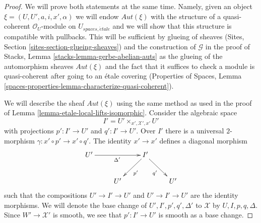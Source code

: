 \documentclass[10pt,a4paper]{amsart}
\theoremstyle{plain}
\theoremstyle{definition}
\theoremstyle{remark}
\numberwithin{equation}{subsection}
\def\etale{{\acute{e}tale}}
\begin{document}
\begin{proof}
We will prove both statements at the same time. Namely, given
an object $\xi = (U, U', a, i, x', \alpha)$ we will endow
$\mathit{Aut}(\xi)$ with the structure of a
quasi-coherent $\mathcal{O}_U$-module on $U_{spaces, \etale}$ and
we will show that this structure is compatible with pullbacks.
This will be sufficient by glueing of sheaves
(Sites, Section \ref{sites-section-glueing-sheaves})
and the construction of $\mathcal{G}$ in the proof of
Stacks, Lemma \ref{stacks-lemma-gerbe-abelian-auts}
as the glueing of the automorphism sheaves $\mathit{Aut}(\xi)$
and the fact that it suffices to check a module is
quasi-coherent after going to an \'etale covering
(Properties of Spaces, Lemma
\ref{spaces-properties-lemma-characterize-quasi-coherent}).

\medskip\noindent
We will describe the sheaf $\mathit{Aut}(\xi)$ using the
same method as used in the proof of
Lemma \ref{lemma-etale-local-lifts-isomorphic}.
Consider the algebraic space
$$
I' = U' \times_{x', \mathcal{X}', x'} U'
$$
with projections $p' : I' \to U'$ and $q' : I' \to U'$.
Over $I'$ there is a universal $2$-morphism
$\gamma : x' \circ p' \to x' \circ q'$.
The identity $x' \to x'$ defines a diagonal morphism
$$
\xymatrix{
U' \ar[rr]_{\Delta'} & & I' \ar[ld]^{p'} \ar[rd]_{q'} \\
& U' & & U'
}
$$
such that the compositions $U' \to I' \to U'$ and $U' \to I' \to U'$
are the identity morphisms. We will denote the base change of
$U', I', p', q', \Delta'$ to $\mathcal{X}$ by $U, I, p, q, \Delta$.
Since $W' \to \mathcal{X}'$ is smooth, we see that $p' : I' \to U'$
is smooth as a base change.


\end{proof}
\end{document}
